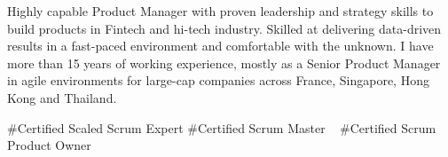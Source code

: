 

\begin{cvparagraph}


Highly capable Product Manager with proven leadership and strategy skills to build products in Fintech and hi-tech industry. Skilled at delivering data-driven results in a fast-paced environment and comfortable with the unknown. I have more than 15 years of working experience, mostly as a Senior Product Manager in agile environments for large-cap companies across France, Singapore, Hong Kong and Thailand.
\newline

\end{cvparagraph}
\begin{cvtechnologies}
 \#Certified Scaled Scrum Expert  
 \#Certified Scrum Master ~
 \#Certified Scrum Product Owner ~
\end{cvtechnologies}
